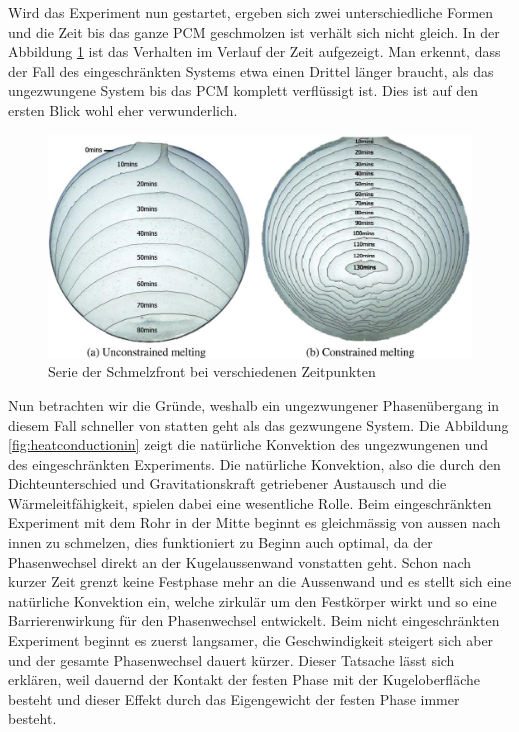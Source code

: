 \documentclass[11pt,a4paper]{scrartcl}
\begin{document}
Wird das Experiment nun gestartet, ergeben sich zwei unterschiedliche Formen und
die Zeit bis das ganze PCM geschmolzen ist verhält sich nicht gleich. In der
Abbildung \ref{fig:meltingphasefront} ist das Verhalten im Verlauf der Zeit
aufgezeigt. Man erkennt, dass der Fall des eingeschränkten Systems etwa einen
Drittel länger braucht, als das ungezwungene System bis das PCM komplett
verflüssigt ist. Dies ist auf den ersten Blick wohl eher verwunderlich.

\begin{figure}[h!]
\begin{center}
\includegraphics[scale=0.35]{images/meltingphasefront.jpg}
\caption{Serie der Schmelzfront bei verschiedenen Zeitpunkten
\cite{meltingpaper}}
\label{fig:meltingphasefront}
\end{center}
\end{figure}

Nun betrachten wir die Gründe, weshalb ein ungezwungener Phasenübergang in
diesem Fall schneller von statten geht als das gezwungene System. Die Abbildung
\ref{fig:heatconductionin} zeigt die natürliche Konvektion des ungezwungenen
und des eingeschränkten Experiments. Die natürliche Konvektion, also die durch
den Dichteunterschied und Gravitationskraft getriebener Austausch und die
Wärmeleitfähigkeit, spielen dabei eine wesentliche Rolle. Beim
eingeschränkten Experiment mit dem Rohr in der Mitte beginnt es gleichmässig von aussen nach
innen zu schmelzen, dies funktioniert zu Beginn auch optimal, da der
Phasenwechsel direkt an der Kugelaussenwand vonstatten geht. Schon nach kurzer
Zeit grenzt keine Festphase mehr an die Aussenwand und es stellt sich eine
natürliche Konvektion ein, welche zirkulär um den Festkörper wirkt und so eine
Barrierenwirkung für den Phasenwechsel entwickelt. Beim nicht eingeschränkten
Experiment beginnt es zuerst langsamer, die Geschwindigkeit steigert sich aber
und der gesamte Phasenwechsel dauert kürzer. Dieser Tatsache lässt sich
erklären, weil dauernd der Kontakt der festen Phase mit der Kugeloberfläche
besteht und dieser Effekt durch das Eigengewicht der festen Phase immer besteht.
\end{document}
